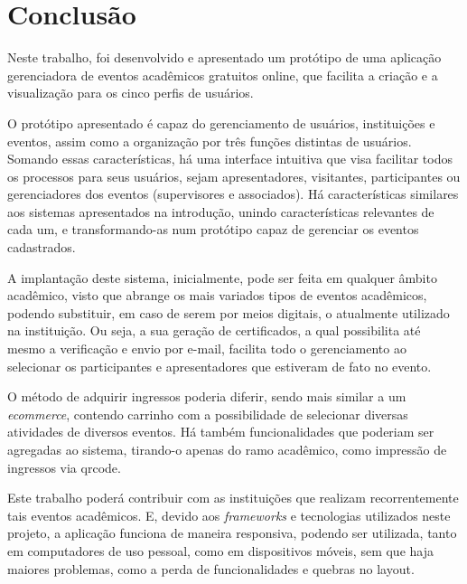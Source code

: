 \chapter{Conclusão}\label{chp:LABEL_CHP_6}

Neste trabalho, foi desenvolvido e apresentado um protótipo de uma aplicação gerenciadora de eventos acadêmicos gratuitos online, que facilita a criação e a visualização para os cinco perfis de usuários.

O protótipo apresentado é capaz do gerenciamento de usuários, instituições e eventos, assim como a organização por três funções distintas de usuários. Somando essas características, há uma interface intuitiva que visa facilitar todos os processos para seus usuários, sejam apresentadores, visitantes, participantes ou gerenciadores dos eventos (supervisores e associados). Há características similares aos sistemas apresentados na introdução, unindo características relevantes de cada um, e transformando-as num protótipo capaz de gerenciar os eventos cadastrados.

A implantação deste sistema, inicialmente, pode ser feita em qualquer âmbito acadêmico, visto que abrange os mais variados tipos de eventos acadêmicos, podendo substituir, em caso de serem por meios digitais, o atualmente utilizado na instituição. Ou seja, a sua geração de certificados, a qual possibilita até mesmo a verificação e envio por e-mail, facilita todo o gerenciamento ao selecionar os participantes e apresentadores que estiveram de fato no evento.


O método de adquirir ingressos poderia diferir, sendo mais similar a um \textit{ecommerce}, contendo carrinho com a possibilidade de selecionar diversas atividades de diversos eventos. Há também funcionalidades que poderiam ser agregadas ao sistema, tirando-o apenas do ramo acadêmico, como impressão de ingressos via qrcode. 


Este trabalho poderá contribuir com as instituições que realizam recorrentemente tais eventos acadêmicos.  E, devido aos \textit{frameworks} e tecnologias utilizados neste projeto, a aplicação funciona de maneira responsiva, podendo ser utilizada, tanto em computadores de uso pessoal, como em dispositivos móveis, sem que haja maiores problemas, como a perda de funcionalidades e quebras no layout.


